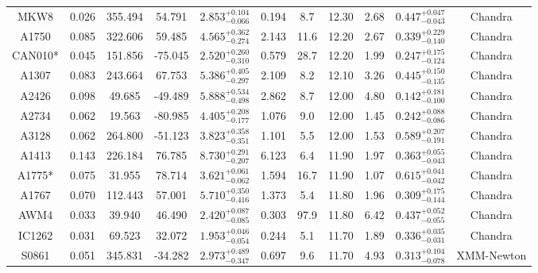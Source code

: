 \documentclass{aa}   %
\begin{document}
\begin{table}[h!]
\begin{center}
\begin{tabular}{ c  c  c  c c c c c c c c }
MKW8                		&		0.026	&	355.494	&	54.791	& $	2.853^{+0.104}_{-0.066}$  &      0.194	&  8.7	&	12.30	&	2.68	&	$ 0.447^{+0.047}_{-0.043}  $ &	  Chandra     \\
A1750               		&		0.085	&	322.606	&	59.485	& $	4.565^{+0.362}_{-0.274}$  &      2.143	&  11.6	&	12.20	&	2.67	&	$ 0.339^{+0.229}_{-0.140}  $ &	  Chandra     \\
CAN010*             		&		0.045	&	151.856	&	-75.045	& $	2.520^{+0.260}_{-0.310}$  &      0.579	&  28.7	&	12.20	&	1.99	&	$ 0.247^{+0.175}_{-0.124}  $ &	  Chandra     \\
A1307               		&		0.083	&	243.664	&	67.753	& $	5.386^{+0.405}_{-0.297}$  &      2.109	&  8.2	&	12.10	&	3.26	&	$ 0.445^{+0.150}_{-0.135}  $ &	  Chandra     \\
A2426               		&		0.098	&	49.685	&	-49.489	& $	5.888^{+0.534}_{-0.498}$  &      2.862	&  8.7	&	12.00	&	4.80	&	$ 0.142^{+0.181}_{-0.100}  $ &	  Chandra     \\
A2734               		&		0.062	&	19.563	&	-80.985	& $	4.405^{+0.208}_{-0.177}$  &      1.076	&  9.0	&	12.00	&	1.45	&	$ 0.242^{+0.088}_{-0.086}  $ &	  Chandra     \\
A3128               		&		0.062	&	264.800	&	-51.123	& $	3.823^{+0.358}_{-0.351}$  &      1.101	&  5.5	&	12.00	&	1.53	&	$ 0.589^{+0.207}_{-0.191}  $ &	  Chandra     \\
A1413               		&		0.143	&	226.184	&	76.785	& $	8.730^{+0.291}_{-0.207}$  &      6.123	&  6.4	&	11.90	&	1.97	&	$ 0.363^{+0.055}_{-0.043}  $ &	  Chandra     \\
A1775*              		&		0.075	&	31.955	&	78.714	& $	3.621^{+0.061}_{-0.062}$  &      1.594	&  16.7	&	11.90	&	1.07	&	$ 0.615^{+0.041}_{-0.042}  $ &	  Chandra     \\
A1767               		&		0.070	&	112.443	&	57.001	& $	5.710^{+0.350}_{-0.416}$  &      1.373	&  5.4	&	11.80	&	1.96	&	$ 0.309^{+0.175}_{-0.144}  $ &	  Chandra     \\
AWM4                		&		0.033	&	39.940	&	46.490	& $	2.420^{+0.087}_{-0.085}$  &      0.303	&  97.9	&	11.80	&	6.42	&	$ 0.437^{+0.052}_{-0.055}  $ &	 Chandra      \\
IC1262              		&		0.031	&	69.523	&	32.072	& $	1.953^{+0.046}_{-0.054}$  &      0.244	&  5.1	&	11.70	&	1.89	&	$ 0.336^{+0.035}_{-0.031}  $ &	  Chandra     \\
S0861               		&		0.051	&	345.831	&	-34.282	& $	2.973^{+0.489}_{-0.347}$  &      0.697	&  9.6	&	11.70	&	4.93	&	$ 0.313^{+0.104}_{-0.078}  $ &	  XMM-Newton  \\

\end{tabular}
\end{center}
\end{table}
\end{document}
